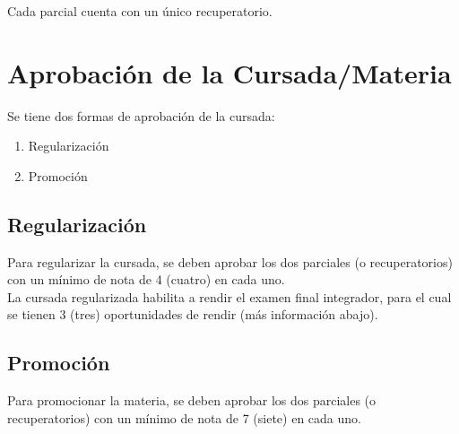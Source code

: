 \documentclass[
  letterpaper,
  DIV=11,
  numbers=noendperiod]{scrreprt}
\providecommand{\tightlist}{%
  \setlength{\itemsep}{0pt}\setlength{\parskip}{0pt}}\usepackage{longtable,booktabs,array}
\begin{document}
Cada parcial cuenta con un único recuperatorio.

\section*{Aprobación de la
Cursada/Materia}\label{aprobaciuxf3n-de-la-cursadamateria}


Se tiene dos formas de aprobación de la cursada:

\begin{enumerate}
\def\labelenumi{\arabic{enumi}.}
\tightlist
\item
  Regularización
\item
  Promoción
\end{enumerate}

\subsection*{Regularización}\label{regularizaciuxf3n}

Para regularizar la cursada, se deben aprobar los dos parciales (o
recuperatorios) con un mínimo de nota de 4 (cuatro) en cada uno.\\

La cursada regularizada habilita a rendir el examen final integrador,
para el cual se tienen 3 (tres) oportunidades de rendir (más información
abajo).

\subsection*{Promoción}\label{promociuxf3n}

Para promocionar la materia, se deben aprobar los dos parciales (o
recuperatorios) con un mínimo de nota de 7 (siete) en cada uno.\\
\end{document}
